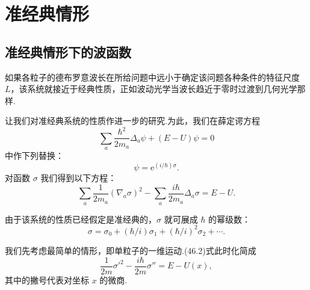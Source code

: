 \chapter{准经典情形}

\section{准经典情形下的波函数}

如果各粒子的德布罗意波长在所给问题中远小于确定该问题各种条件的特征尺度 $L$，该系统就接近于经典性质，正如波动光学当波长趋近于零时过渡到几何光学那样.

让我们对准经典系统的性质作进一步的研究.为此，我们在薛定谔方程
\begin{equation*}
  \sum_a\frac{\hbar^2}{2m_a}\Delta_a\psi+(E-U)\psi=0
\end{equation*}
中作下列替换：
\begin{equation}
  \psi=\mathrm{e}^{(i/\hbar)\sigma}.
\end{equation}
对函数 $\sigma$ 我们得到以下方程：
\begin{equation}
  \sum_a\frac{1}{2m_a}(\nabla_a\sigma)^2
  -\sum_a\frac{i\hbar}{2m_a}\Delta_a\sigma=E-U.
\end{equation}

由于该系统的性质已经假定是准经典的，$\sigma$ 就可展成 $\hbar$ 的幂级数：
\begin{equation}
  \sigma=\sigma_0+(\hbar/i)\sigma_1+(\hbar/i)^2\sigma_2+\cdots.
\end{equation}

我们先考虑最简单的情形，即单粒子的一维运动.(46.2)式此时化简成
\begin{equation}
  \frac{1}{2m}{\sigma'}^2-\frac{i\hbar}{2m}\sigma''=E-U(x),
\end{equation}
其中的撇号代表对坐标 $x$ 的微商.

